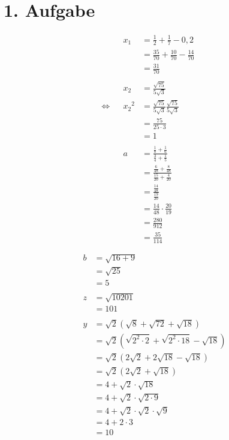 \documentclass[]{article}
\begin{document}
\section*{1. Aufgabe}
	\begin{multicols}{2}
		\begin{align*}
			&&  x_1 &= \frac{1}{2} + \frac{1}{7} - 0,2 &&\\
			&& &=\frac{35}{70} + \frac{10}{70} - \frac{14}{70} &&\\
			&& &=\frac{31}{70} &&\\
		\\%
			&& x_2 &= \frac{\sqrt{75}}{5\sqrt{3}} &&\\
			\Leftrightarrow&& {x_2}^2 &= \frac{\sqrt{75}}{5\sqrt{3}}  \frac{\sqrt{75}}{5\sqrt{3}}&&\\
			&&  &= \frac{75}{25\cdot3}&&\\
			&&  &= 1&&\\
		\\%
			&& a&= \frac{\frac{1}{8}+\frac{1}{6}}{\frac{3}{4}+\frac{1}{5}} &&\\
			&& &= \frac{\frac{6}{48}+\frac{8}{48}}{\frac{15}{20}+\frac{4}{20}} &&\\
			&& &= \frac{\frac{14}{48}}{\frac{19}{20}}&&\\
			&& &= \frac{14}{48} \cdot \frac{20}{19}&&\\
			&& &= \frac{280}{912}&&\\
			&& &= \frac{35}{114}&&\\
		\end{align*}
		\begin{align*}
			\\%
				&& b&= \sqrt{16+9}&&\\
				&& &= \sqrt{25}&&\\
				&& &= 5&&\\
			\\%
				&& z&= \sqrt{10201} &&\\
				&& &= 101&&\\
		\\%
			&& y&= \sqrt{2} (\sqrt{8} + \sqrt{72} + \sqrt{18})&&\\
			&& &= \sqrt{2} (\sqrt{2^2 \cdot 2} + \sqrt{2^2 \cdot 18} - \sqrt{18}) &&\\
			&& &= \sqrt{2} (2\sqrt{2} + 2\sqrt{18} - \sqrt{18}) &&\\
			&& &= \sqrt{2} (2\sqrt{2} + \sqrt{18}) &&\\
			&& &= 4 + \sqrt{2} \cdot \sqrt{18} &&\\
			&& &= 4 + \sqrt{2} \cdot \sqrt{2 \cdot 9} &&\\
			&& &= 4 + \sqrt{2} \cdot \sqrt{2} \cdot \sqrt{9} &&\\
			&& &= 4 + 2\cdot 3 &&\\
			&& &= 10 &&\\
		\end{align*}

	\end{multicols}
\end{document}
